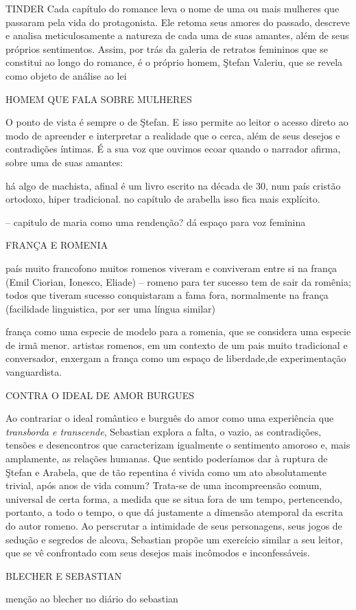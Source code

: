 
TINDER
Cada capítulo do romance leva o nome de uma ou mais mulheres que passaram
pela vida do protagonista. Ele retoma seus amores do passado,
descreve e analisa meticulosamente a natureza de cada uma de suas
amantes, além de seus próprios sentimentos.
Assim, por trás da galeria de retratos femininos que se constitui ao
longo do romance, é o próprio homem, Ştefan Valeriu, que se revela como
objeto de análise ao lei


HOMEM QUE FALA SOBRE MULHERES

O ponto de vista é sempre o de Ştefan. E isso permite ao leitor o acesso direto ao modo de
apreender e interpretar a realidade que o cerca, além de seus desejos
e contradições íntimas. É a sua voz que ouvimos ecoar quando
o narrador afirma, sobre uma de suas amantes:

há algo de machista, afinal é um livro escrito na década de 30, num país cristão ortodoxo, hiper tradicional.
no capítulo de arabella isso fica mais explícito.

-- capitulo de maria como uma rendenção? dá espaço para voz feminina

FRANÇA E ROMENIA

país muito francofono 
muitos romenos viveram e conviveram entre si na frança (Emil Ciorian, Ionesco, Eliade) -- romeno para ter sucesso tem de sair da romênia; todos que tiveram sucesso conquistaram a fama fora, normalmente na frança (facilidade linguistica, por ser uma língua similar)

frança como uma especie de modelo para a romenia, que se considera uma especie de irmã menor.
artistas romenos, em um contexto de um pais muito tradicional e conversador, enxergam a frança como um espaço de liberdade,de experimentação vanguardista.



CONTRA O IDEAL DE AMOR BURGUES


Ao contrariar o ideal romântico e burguês do amor como uma experiência
que \textit{transborda e transcende}, Sebastian explora a falta, o vazio, as
contradições, tensões e desencontros que caracterizam igualmente o
sentimento amoroso e, mais amplamente, as relações humanas. Que sentido
poderíamos dar à ruptura de Ştefan e Arabela, que de tão repentina é
vivida como um ato absolutamente trivial, após anos de vida comum?
Trata-se de uma incompreensão comum, universal de certa forma, a medida
que se situa fora de um tempo, pertencendo, portanto, a todo o tempo, o
que dá justamente a dimensão atemporal da escrita do autor romeno. Ao
perscrutar a intimidade de seus personagens, seus jogos de sedução e
segredos de alcova, Sebastian propõe um exercício similar a seu
leitor, que se vê confrontado com seus desejos mais incômodos e
inconfessáveis.


BLECHER E SEBASTIAN

menção ao blecher no diário do sebastian